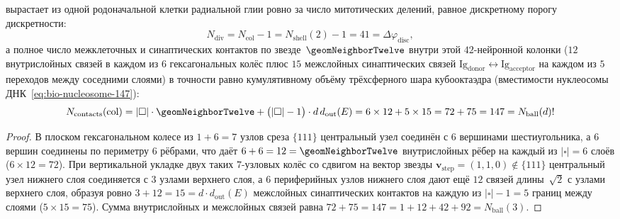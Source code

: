 \begin{theorem}
\begin{enumerate}[leftmargin=*]
\begin{equation}
  \end{equation}
  вырастает из одной родоначальной клетки радиальной глии ровно за число митотических делений, равное дискретному порогу дискретности:
  \begin{equation}
  \label{eq:bio-cortex-41-divisions}
    N_{\mathrm{div}} = N_{\mathrm{col}} - 1 = N_{\mathrm{shell}}(2) - 1 = 41 = \Delta\varphi_{\mathrm{disc}},
  \end{equation}
  а полное число межклеточных и синаптических контактов по звезде~$\geomNeighborTwelve$ внутри этой $42$-нейронной колонки ($12$ внутрислойных связей в каждом из $6$ гексагональных колёс плюс $15$ межслойных синаптических связей $\text{Ig}_{\mathrm{donor}}\leftrightarrow\text{Ig}_{\mathrm{acceptor}}$ на каждом из $5$ переходов между соседними слоями) в точности равно кумулятивному объёму трёхсферного шара кубооктаэдра (вместимости нуклеосомы ДНК~\eqref{eq:bio-nucleosome-147}):
  \begin{equation}
  \label{eq:bio-cortex-147-contacts}
    N_{\mathrm{contacts}}(\text{col})
    = |\square|\cdot\geomNeighborTwelve + \bigl(|\square| - 1\bigr)\cdot d\,d_{\mathrm{out}}(E)
    = 6\times 12 + 5\times 15
    = 72 + 75
    = 147
    = N_{\mathrm{ball}}(d)!
  \end{equation}
\end{enumerate}
\end{theorem}

\begin{proof}
В плоском гексагональном колесе из $1 + 6 = 7$ узлов среза $\{111\}$ центральный узел соединён с $6$ вершинами шестиугольника, а $6$ вершин соединены по периметру $6$ рёбрами, что даёт $6 + 6 = 12 = \geomNeighborTwelve$ внутрислойных рёбер на каждый из $|\square|=6$ слоёв ($6\times 12 = 72$).
При вертикальной укладке двух таких $7$-узловых колёс со сдвигом на вектор звезды $\mathbf{v}_{\mathrm{step}} = (1,1,0) \notin \{111\}$ центральный узел нижнего слоя соединяется с $3$ узлами верхнего слоя, а $6$ периферийных узлов нижнего слоя дают ещё $12$ связей длины~$\sqrt{2}$ с узлами верхнего слоя, образуя ровно $3 + 12 = 15 = d\cdot d_{\mathrm{out}}(E)$ межслойных синаптических контактов на каждую из $|\square|-1 = 5$ границ между слоями ($5\times 15 = 75$).
Сумма внутрислойных и межслойных связей равна $72 + 75 = 147 = 1 + 12 + 42 + 92 = N_{\mathrm{ball}}(3)$.
\end{proof}

